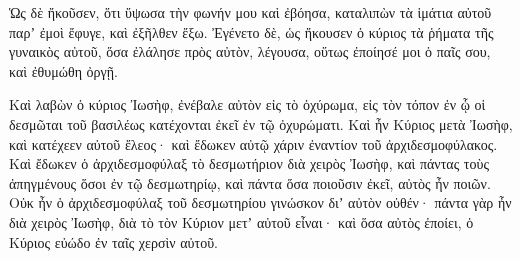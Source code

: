 {Ὡς δὲ ἤκοῦσεν, ὅτι ὕψωσα τὴν φωνήν μου καὶ ἐβόησα, καταλιπὼν τὰ ἱμάτια αὐτοῦ παρʼ ἐμοὶ ἔφυγε, καὶ ἐξῆλθεν ἔξω.
Ἐγένετο δὲ, ὡς ἤκουσεν ὁ κύριος τὰ ῥήματα τῆς γυναικὸς αὐτοῦ, ὅσα ἐλάλησε πρὸς αὐτὸν, λέγουσα, οὕτως ἐποίησέ μοι ὁ παῖς σου, καὶ ἐθυμώθη ὀργῇ.
\par }{\PP {}Καὶ λαβὼν ὁ κύριος Ἰωσὴφ, ἐνέβαλε αὐτὸν εἰς τὸ ὀχύρωμα, εἰς τὸν τόπον ἐν ᾧ οἱ δεσμῶται τοῦ βασιλέως κατέχονται ἐκεῖ ἐν τῷ ὀχυρώματι.
Καὶ ἦν Κύριος μετὰ Ἰωσὴφ, καὶ κατέχεεν αὐτοῦ ἔλεος· καὶ ἔδωκεν αὐτῷ χάριν ἐναντίον τοῦ ἀρχιδεσμοφύλακος.
Καὶ ἔδωκεν ὁ ἀρχιδεσμοφύλαξ τὸ δεσμωτήριον διὰ χειρὸς Ἰωσὴφ, καὶ πάντας τοὺς ἀπηγμένους ὅσοι ἐν τῷ δεσμωτηρίῳ, καὶ πάντα ὅσα ποιοῦσιν ἐκεῖ, αὐτὸς ἦν ποιῶν.
Οὐκ ἦν ὁ ἀρχιδεσμοφύλαξ τοῦ δεσμωτηρίου γινώσκον διʼ αὐτὸν οὐθέν· πάντα γὰρ ἦν διὰ χειρὸς Ἰωσὴφ, διὰ τὸ τὸν Κύριον μετʼ αὐτοῦ εἶναι· καὶ ὅσα αὐτὸς ἐποίει, ὁ Κύριος εὐώδο ἐν ταῖς χερσὶν αὐτοῦ.

}
